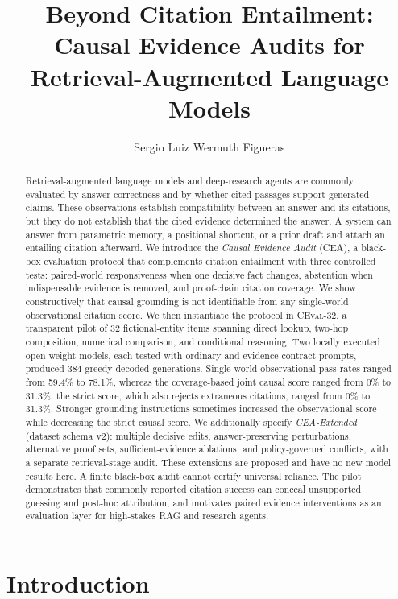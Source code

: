 \documentclass[10pt,twocolumn]{article}
\title{Beyond Citation Entailment: Causal Evidence Audits for Retrieval-Augmented Language Models}
\author{Sergio Luiz Wermuth Figueras}
\date{}
\newcommand{\method}{\textsc{CEA}}
\newcommand{\dataset}{\textsc{CEval-32}}
\begin{document}
\maketitle

\begin{abstract}
Retrieval-augmented language models and deep-research agents are commonly evaluated by answer correctness and by whether cited passages support generated claims. These observations establish compatibility between an answer and its citations, but they do not establish that the cited evidence determined the answer. A system can answer from parametric memory, a positional shortcut, or a prior draft and attach an entailing citation afterward. We introduce the \emph{Causal Evidence Audit} (\method), a black-box evaluation protocol that complements citation entailment with three controlled tests: paired-world responsiveness when one decisive fact changes, abstention when indispensable evidence is removed, and proof-chain citation coverage. We show constructively that causal grounding is not identifiable from any single-world observational citation score. We then instantiate the protocol in \dataset, a transparent pilot of 32 fictional-entity items spanning direct lookup, two-hop composition, numerical comparison, and conditional reasoning. Two locally executed open-weight models, each tested with ordinary and evidence-contract prompts, produced 384 greedy-decoded generations. Single-world observational pass rates ranged from 59.4\% to 78.1\%, whereas the coverage-based joint causal score ranged from 0\% to 31.3\%; the strict score, which also rejects extraneous citations, ranged from 0\% to 31.3\%. Stronger grounding instructions sometimes increased the observational score while decreasing the strict causal score. We additionally specify \emph{CEA-Extended} (dataset schema v2): multiple decisive edits, answer-preserving perturbations, alternative proof sets, sufficient-evidence ablations, and policy-governed conflicts, with a separate retrieval-stage audit. These extensions are proposed and have no new model results here. A finite black-box audit cannot certify universal reliance. The pilot demonstrates that commonly reported citation success can conceal unsupported guessing and post-hoc attribution, and motivates paired evidence interventions as an evaluation layer for high-stakes RAG and research agents.
\end{abstract}

\section{Introduction}
\end{document}
